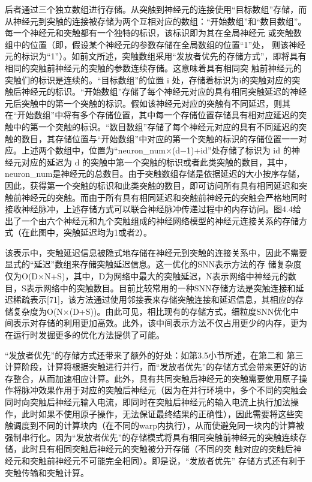 后者通过三个独立数组进行存储。从突触到神经元的连接使用“目标数组”存储，而从神经元到突触的连接被存储为两个互相对应的数组：“开始数组”和“数目数组”。每一个神经元和突触都有一个独特的标识，该标识即为其在全局神经元 或突触数组中的位置（即，假设某个神经元的参数存储在全局数组的位置“1”处， 则该神经元的标识为“1”）。如前文所述，突触数组采用“发放者优先的存储方式”，即将具有相同的突触前神经元的突触的参数连续存储。这意味着具有相同突 触前神经元的突触们的标识是连续的。“目标数组”的位置 i 处，存储着标识为i的突触对应的突触后神经元的标识。“开始数组”存储了每个神经元对应的具有相同突触延迟的神经元后突触中的第一个突触的标识。假如该神经元对应的突触有不同延迟，则其在“开始数组”中将有多个存储位置，其中每一个存储位置存储具有相对应延迟的突触中的第一个突触的标识。“数目数组”存储了每个神经元对应的具有不同延迟的突触的数目，其存储位置与“开始数组”中对应的第一个突触的标识的存储位置一一对应。上述两个数组中，位置为“neuron\_num×(d−1)+id”处存储了标识为 id 的神经元对应的延迟为 d 的突触中第一个突触的标识或者此类突触的数目，其中，neuron\_num是神经元的总数目。由于突触数组存储是依据延迟的大小按序存储，因此，获得第一个突触的标识和此类突触的数目，即可访问所有具有相同延迟和突触前神经元的突触。而由于所有具有相同延迟和突触前神经元的突触会严格地同时接收神经脉冲，上述存储方式可以联合神经脉冲传递过程中的内存访问。图4.4给出了一个由六个神经元和九个突触组成的神经网络模型的神经元连接关系的存储方式（在此图中，突触延迟均为1或者2）。

该表示中，突触延迟信息被隐式地存储在神经元到突触的连接关系中，因此不需要显式的“延迟”数组来存储突触延迟信息。这一优化的SNN表示方法的存 储复杂度仅为O(D×N+S)，其中，D为网络中最大的突触延迟，N表示网络中神经元的数目，S表示网络中的突触数目。目前比较常用的一种SNN存储方法是突触连接和延迟稀疏表示[71]，该方法通过使用邻接表来存储突触连接和延迟信息，其相应的存储复杂度为O(N×(D+S))。由此可见，相比现有的存储方式，细粒度SNN优化中间表示对存储的利用更加高效。此外，该中间表示方法不仅占用更少的内存，更为在运行时发掘更多的优化方法提供了可能。

“发放者优先”的存储方式还带来了额外的好处：如第3.5小节所述，在第二和 第三计算阶段，计算将根据突触进行并行，而“发放者优先”的存储方式会带来更好的访存整合，从而加速相应计算。此外，具有共同突触后神经元的突触需要使用原子操作将脉冲效果作用于对应的突触后神经元（因为在并行环境中，多个不同的突触会同时向突触后神经元输入电流，即同时在突触后神经元的输入电流上执行加法操作，此时如果不使用原子操作，无法保证最终结果的正确性），因此需要将这些突触调度到不同的计算块内（在不同的warp内执行），从而使避免同一块内的计算被强制串行化。因为“发放者优先”的存储模式将具有相同突触前神经元的突触连续存储，此时具有相同突触后神经元的突触被分开存储（不同的突 触对应的突触后神经元和突触前神经元不可能完全相同）。即是说，“发放者优先” 存储方式还有利于突触传输和突触计算。

